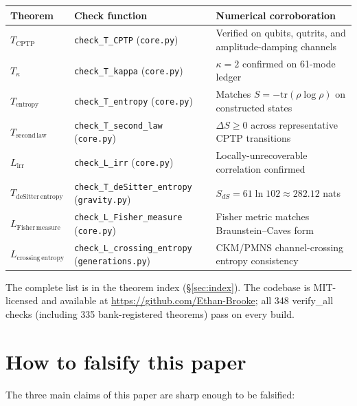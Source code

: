 \documentclass[11pt]{article}
\begin{document}
\begin{center}
\small
\begin{tabular}{lll}
\toprule
\textbf{Theorem} & \textbf{Check function} & \textbf{Numerical corroboration}\\
\midrule
$T_{\mathrm{CPTP}}$ & \texttt{check\_T\_CPTP} (\texttt{core.py}) & Verified on qubits, qutrits, and amplitude-damping channels\\
$T_{\kappa}$ & \texttt{check\_T\_kappa} (\texttt{core.py}) & $\kappa = 2$ confirmed on 61-mode ledger\\
$T_{\mathrm{entropy}}$ & \texttt{check\_T\_entropy} (\texttt{core.py}) & Matches $S = -\mathrm{tr}(\rho\log\rho)$ on constructed states\\
$T_{\mathrm{second\,law}}$ & \texttt{check\_T\_second\_law} (\texttt{core.py}) & $\Delta S \geq 0$ across representative CPTP transitions\\
$L_{\mathrm{irr}}$ & \texttt{check\_L\_irr} (\texttt{core.py}) & Locally-unrecoverable correlation confirmed\\
$T_{\mathrm{deSitter\,entropy}}$ & \texttt{check\_T\_deSitter\_entropy} (\texttt{gravity.py}) & $S_{dS} = 61\ln 102 \approx 282.12$ nats\\
$L_{\mathrm{Fisher\,measure}}$ & \texttt{check\_L\_Fisher\_measure} (\texttt{core.py}) & Fisher metric matches Braunstein--Caves form~\cite{BraunsteinCaves1994}\\
$L_{\mathrm{crossing\,entropy}}$ & \texttt{check\_L\_crossing\_entropy} (\texttt{generations.py}) & CKM/PMNS channel-crossing entropy consistency\\
\bottomrule
\end{tabular}
\end{center}

\noindent The complete list is in the theorem index (\S\ref{sec:index}).
The codebase is MIT-licensed and available at \url{https://github.com/Ethan-Brooke};
all 348 verify\_all checks (including 335 bank-registered theorems) pass on every build.

\section{How to falsify this paper}
\label{sec:falsify}

The three main claims of this paper are sharp enough to be falsified:
\end{document}
